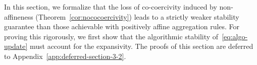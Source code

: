 \documentclass[twoside,11pt]{article}
\let\todo\relax%
\newcommand{\comm}[3][inline]{\todo[#1, size=\tiny]{#2: #3}}
\newcommand{\autodo}[2][inline]{\comm[color=green,#1]{AB}{#2}}
\begin{document}

In this section, we formalize that the loss of co-coercivity induced by non-affineness (Theorem~\ref{cor:nococoercivity}) leads to a strictly weaker stability guarantee than those achievable with positively affine aggregation rules. For proving this rigorously, we first show that the algorithmic stability of~\eqref{eq:algo-update} must account for the expansivity.
The proofs of this section are deferred to Appendix~\ref{app:deferred-section-3-2}.
\end{document}
